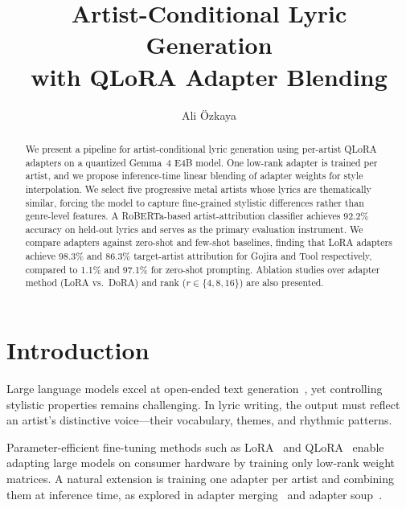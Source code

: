 \documentclass[runningheads]{llncs}
\begin{document}
\title{Artist-Conditional Lyric Generation\\with QLoRA Adapter Blending}

\author{Ali \"Ozkaya}

\maketitle

\begin{abstract}
We present a pipeline for artist-conditional lyric generation using per-artist QLoRA adapters on a quantized Gemma~4 E4B model. One low-rank adapter is trained per artist, and we propose inference-time linear blending of adapter weights for style interpolation. We select five progressive metal artists whose lyrics are thematically similar, forcing the model to capture fine-grained stylistic differences rather than genre-level features. A RoBERTa-based artist-attribution classifier achieves 92.2\% accuracy on held-out lyrics and serves as the primary evaluation instrument. We compare adapters against zero-shot and few-shot baselines, finding that LoRA adapters achieve 98.3\% and 86.3\% target-artist attribution for Gojira and Tool respectively, compared to 1.1\% and 97.1\% for zero-shot prompting. Ablation studies over adapter method (LoRA vs.\ DoRA) and rank ($r \in \{4, 8, 16\}$) are also presented.
\end{abstract}


\section{Introduction}
\label{sec:intro}

Large language models excel at open-ended text generation~\cite{radford2019language}, yet controlling stylistic properties remains challenging. In lyric writing, the output must reflect an artist's distinctive voice---their vocabulary, themes, and rhythmic patterns.

Parameter-efficient fine-tuning methods such as LoRA~\cite{hu2022lora} and QLoRA~\cite{dettmers2023qlora} enable adapting large models on consumer hardware by training only low-rank weight matrices. A natural extension is training one adapter per artist and combining them at inference time, as explored in adapter merging~\cite{huang2023lorahub} and adapter soup~\cite{chronopoulou2023adaptersoup}.
\end{document}
